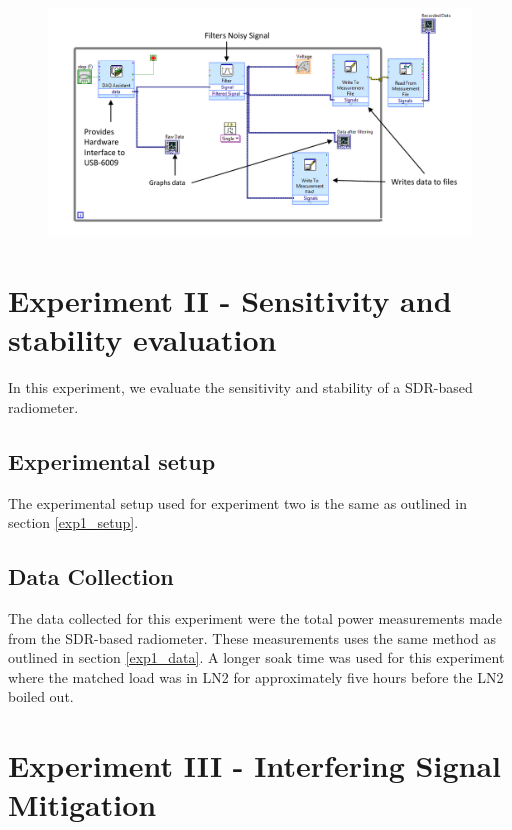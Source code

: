 {\begin{figure}[h!tb] \centering
\includegraphics[width=\textwidth]{Images/labview_diagram.pdf}
\label{labviewblock}
\end{figure}
}

\section{Experiment II - Sensitivity and stability evaluation}\label{Exp2}

In this experiment, we evaluate the sensitivity and stability of a SDR-based radiometer.    

\subsection{Experimental setup} \label{exp2_setup}
The experimental setup used for experiment two is the same as outlined in section \ref{exp1_setup}.  

\subsection{Data Collection}
The data collected for this experiment were the total power measurements made from the SDR-based radiometer.  These measurements uses the same method as outlined in section \ref{exp1_data}.  A longer soak time was used for this experiment where the matched load was in LN2 for approximately five hours before the LN2 boiled out.  

\section{Experiment III - Interfering Signal Mitigation}\label{Exp3}

